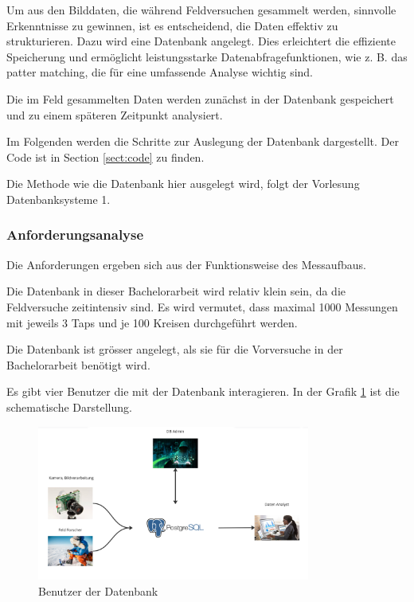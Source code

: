 
Um aus den Bilddaten, die während Feldversuchen gesammelt werden, sinnvolle Erkenntnisse zu gewinnen, ist es entscheidend, die Daten effektiv zu strukturieren. Dazu wird eine Datenbank angelegt. Dies erleichtert die effiziente Speicherung und ermöglicht leistungsstarke Datenabfragefunktionen, wie z. B. das patter matching, die für eine umfassende Analyse wichtig sind.

Die im Feld gesammelten Daten werden zunächst in der Datenbank gespeichert und zu einem späteren Zeitpunkt analysiert.

Im Folgenden werden die Schritte zur Auslegung der Datenbank dargestellt. Der Code ist in Section \ref{sect:code} zu finden.

Die Methode wie die Datenbank hier ausgelegt wird, folgt der Vorlesung Datenbanksysteme 1. \cite{}

\subsubsection{Anforderungsanalyse}

Die Anforderungen ergeben sich aus der Funktionsweise des Messaufbaus.

Die Datenbank in dieser Bachelorarbeit wird relativ klein sein, da die Feldversuche zeitintensiv sind. Es wird vermutet, dass maximal 1000 Messungen mit jeweils 3 Taps und je 100 Kreisen durchgeführt werden.

Die Datenbank ist grösser angelegt, als sie für die Vorversuche in der Bachelorarbeit benötigt wird.

Es gibt vier Benutzer die mit der Datenbank interagieren. In der Grafik \ref{fig:user-db-entwurf} ist die schematische Darstellung.

\begin{figure}
    \centering
    \includegraphics[width=0.8\textwidth]{Bilder/Screenshotfrom2024-04-0115-26-08.png}
    \caption{Benutzer der Datenbank}
    \label{fig:user-db-entwurf}
\end{figure}

